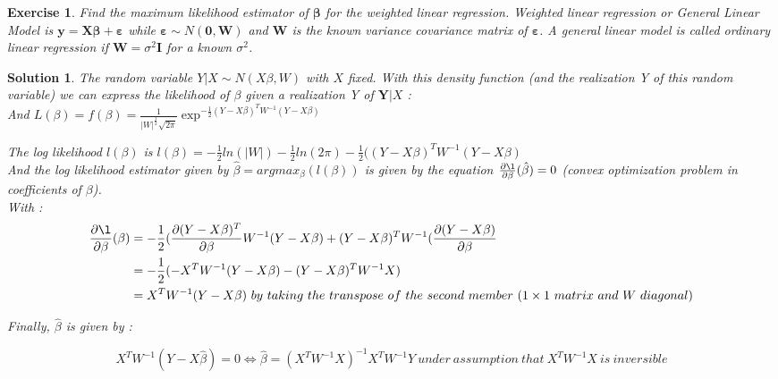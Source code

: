 \documentclass[12pt,a4paper]{article}
\newtheorem{exercise}{Exercise}
\newtheorem{solution}{Solution}
\begin{document}
\begin{exercise}
Find the maximum likelihood estimator of $\boldsymbol \beta$ for the weighted linear regression. Weighted linear regression or \emph{General Linear Model}  is $\mathbf y=\mathbf X\boldsymbol \beta+\boldsymbol \varepsilon$ while $\boldsymbol \varepsilon \sim N(\mathbf 0, \mathbf W)$ and $\mathbf W$ is the known variance covariance matrix of $\boldsymbol \varepsilon$. A general linear model is called ordinary linear regression if $\mathbf W=\sigma^2 \mathbf I$ for a known $\sigma^2$.
\end{exercise}
\begin{solution}
The random variable $Y|X \sim N(X \beta, W)$ with $X$ fixed. With this density function (and the realization Y of this random variable) we can express the likelihood of $\beta$ given a realization Y of $\boldsymbol Y|X$ :\\

And $L(\beta) = f(\beta) = \frac{1}{|W|^{\frac{1}{2}}\sqrt{2\pi}}\exp^{-\frac{1}{2}(Y-X\beta)^TW^{-1}(Y-X\beta)}$

The log likelihood $l(\beta)$ is $l(\beta) = -\frac{1}{2}ln(|W|) -\frac{1}{2}ln(2\pi) - \frac{1}{2}((Y-X\beta)^TW^{-1}(Y-X\beta)$\\

And the log likelihood estimator given by $\hat \beta = argmax_\beta (l(\beta))$ is given by the equation $\frac{\partial \l}{\partial \beta}(\hat \beta) = 0$ (convex optimization problem in coefficients of $\beta$).\\

With :
\begin{equation}
\begin{split}
 \frac{\partial \l}{\partial \beta}(\beta) & = -\frac{1}{2}(\frac{\partial(Y -X\beta)^T}{\partial \beta}W^{-1}(Y-X\beta) + (Y -X\beta)^T W^{-1}(\frac{\partial(Y -X\beta)}{\partial \beta} \\
 & = -\frac{1}{2}(-X^T W^{-1}(Y -X\beta) - (Y -X\beta)^T W^{-1} X) \\
 & = X^T W^{-1}(Y-X \beta) \ by\ taking\ the\ transpose\ of\ the\ second\ member\ (1 \times 1\ matrix\ and\ W\ diagonal)
 \end{split}
\end{equation}

Finally, $\hat \beta$ is given by :

$$\boxed{X^T W^{-1}(Y-X \hat \beta) = 0 \Longleftrightarrow \hat \beta = (X^T W^{-1} X)^{-1} X^T W^{-1} Y\ under\ assumption\ that\ X^T W^{-1} X\ is\ inversible}$$
\end{solution}
\end{document}
